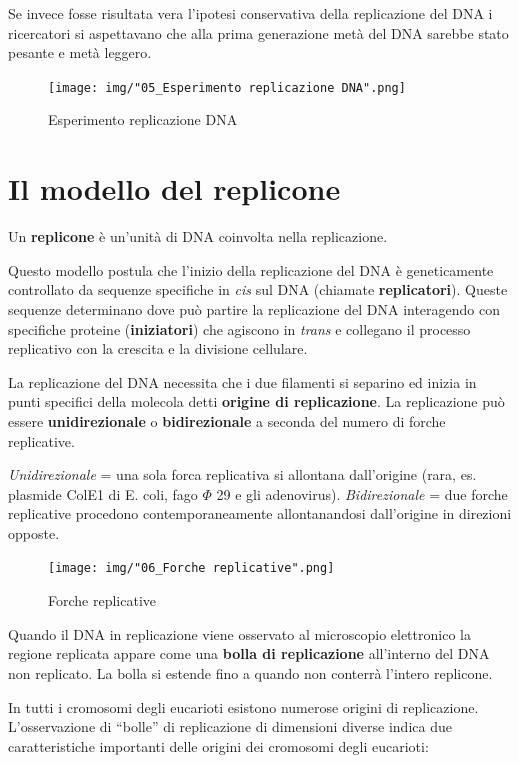 \documentclass[11pt]{book}
\begin{document}
Se invece fosse risultata vera l'ipotesi conservativa della replicazione
del DNA i ricercatori si aspettavano che alla prima generazione metà del
DNA sarebbe stato pesante e metà leggero.

\begin{figure}[htp]
\centering
\texttt{[image: img/"05\_Esperimento replicazione DNA".png]}
\caption{Esperimento replicazione DNA}
\label{esperimento-replicazione-dna}
\end{figure}

\section{Il modello del replicone}\label{il-modello-del-replicone}

Un \textbf{replicone} è un'unità di DNA coinvolta nella replicazione.

Questo modello postula che l'inizio della replicazione del DNA è
geneticamente controllato da sequenze specifiche in \emph{cis} sul DNA
(chiamate \textbf{replicatori}). Queste sequenze determinano dove può
partire la replicazione del DNA interagendo con specifiche proteine
(\textbf{iniziatori}) che agiscono in \emph{trans} e collegano il
processo replicativo con la crescita e la divisione cellulare.

La replicazione del DNA necessita che i due filamenti si separino ed
inizia in punti specifici della molecola detti \textbf{origine di
replicazione}. La replicazione può essere \textbf{unidirezionale} o
\textbf{bidirezionale} a seconda del numero di forche replicative.

\emph{Unidirezionale} = una sola forca replicativa si allontana
dall'origine (rara, es. plasmide ColE1 di E. coli, fago \(\Phi\) 29 e
gli adenovirus). \emph{Bidirezionale} = due forche replicative procedono
contemporaneamente allontanandosi dall'origine in direzioni opposte.

\begin{figure}[htp]
\centering
\texttt{[image: img/"06\_Forche replicative".png]}
\caption{Forche replicative}
\label{forche-replicative}
\end{figure}

Quando il DNA in replicazione viene osservato al microscopio elettronico
la regione replicata appare come una \textbf{bolla di replicazione}
all'interno del DNA non replicato. La bolla si estende fino a quando non
conterrà l'intero replicone.

\clearpage

In tutti i cromosomi degli eucarioti esistono numerose origini di
replicazione. L'osservazione di ``bolle'' di replicazione di dimensioni
diverse indica due caratteristiche importanti delle origini dei
cromosomi degli eucarioti:
\end{document}
